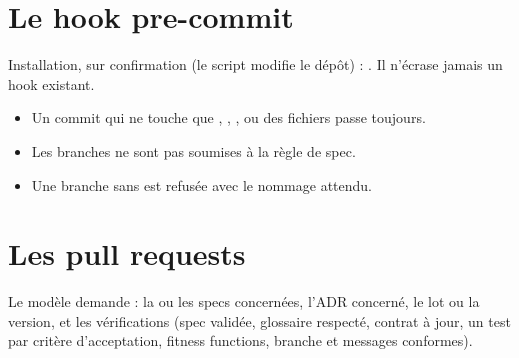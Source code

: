 \section{Le hook pre-commit}
Installation, sur confirmation (le script modifie le dépôt) : . Il n'écrase jamais un hook existant.
\begin{itemize}
  \item Un commit qui ne touche que , , ,  ou des fichiers  passe toujours.
  \item Les branches  ne sont pas soumises à la règle de spec.
  \item Une branche  sans  est refusée avec le nommage attendu.
\end{itemize}

\section{Les pull requests}
Le modèle  demande : la ou les specs concernées, l'ADR concerné, le lot ou la version, et les vérifications (spec validée, glossaire respecté, contrat à jour, un test par critère d'acceptation, fitness functions, branche et messages conformes).
